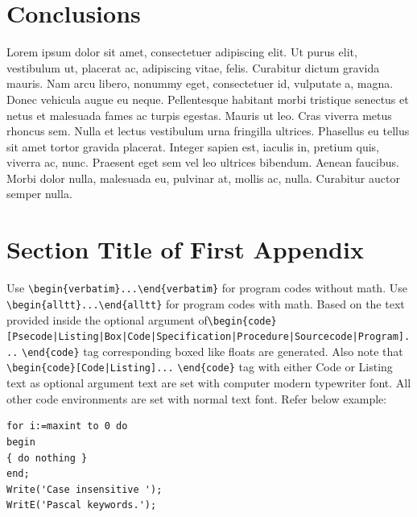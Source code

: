 \documentclass{wber}
\begin{document}
\section{Conclusions}\label{sec5}

Lorem ipsum dolor sit amet, consectetuer adipiscing elit. Ut purus elit, vestibulum ut, placerat ac, adipiscing vitae,
felis. Curabitur dictum gravida mauris. Nam arcu libero, nonummy eget, consectetuer id, vulputate a, magna. Donec
vehicula augue eu neque. Pellentesque habitant morbi tristique senectus et netus et malesuada fames ac turpis egestas.
Mauris ut leo. Cras viverra metus rhoncus sem. Nulla et lectus vestibulum urna fringilla ultrices. Phasellus eu tellus
sit amet tortor gravida placerat. Integer sapien est, iaculis in, pretium quis, viverra ac, nunc. Praesent eget sem vel
leo ultrices bibendum. Aenean faucibus. Morbi dolor nulla, malesuada eu, pulvinar at, mollis ac, nulla. Curabitur
auctor semper nulla.


\appendix

\section{Section Title of First Appendix\label{app1}}

Use \verb+\begin{verbatim}...\end{verbatim}+ for program codes without math. Use \verb+\begin{alltt}...\end{alltt}+ for program codes with math. Based on the text provided inside the optional argument of\break \verb+\begin{code}[Psecode|Listing|Box|Code|+\hfill\break \verb+Specification|Procedure|Sourcecode|Program]...+ \verb+\end{code}+ tag corresponding boxed like floats are generated. Also note that \verb+\begin{code}[Code|Listing]...+ \verb+\end{code}+ tag with either Code or Listing text as optional argument text are set with computer modern typewriter font.  All other code environments are set with normal text font. Refer below example:

\begin{lstlisting}[caption={Descriptive caption text},label=DescriptiveLabel]
for i:=maxint to 0 do
begin
{ do nothing }
end;
Write('Case insensitive ');
WritE('Pascal keywords.');
\end{lstlisting}
\end{document}

